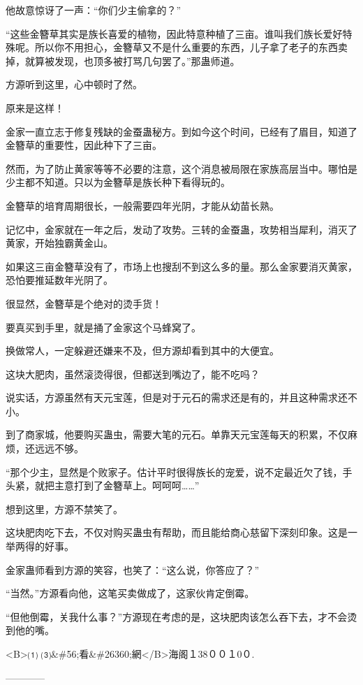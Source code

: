 \begin{this_body}
他故意惊讶了一声：“你们少主偷拿的？”

“这些金簪草其实是族长喜爱的植物，因此特意种植了三亩。谁叫我们族长爱好特殊呢。所以你不用担心，金簪草又不是什么重要的东西，儿子拿了老子的东西卖掉，就算被发现，也顶多被打骂几句罢了。”那蛊师道。

方源听到这里，心中顿时了然。

原来是这样！

金家一直立志于修复残缺的金蚕蛊秘方。到如今这个时间，已经有了眉目，知道了金簪草的重要性，因此种下了三亩。

然而，为了防止黄家等等不必要的注意，这个消息被局限在家族高层当中。哪怕是少主都不知道。只以为金簪草是族长种下看得玩的。

金簪草的培育周期很长，一般需要四年光阴，才能从幼苗长熟。

记忆中，金家就在一年之后，发动了攻势。三转的金蚕蛊，攻势相当犀利，消灭了黄家，开始独霸黄金山。

如果这三亩金簪草没有了，市场上也搜刮不到这么多的量。那么金家要消灭黄家，恐怕要推延数年光阴了。

很显然，金簪草是个绝对的烫手货！

要真买到手里，就是捅了金家这个马蜂窝了。

换做常人，一定躲避还嫌来不及，但方源却看到其中的大便宜。

这块大肥肉，虽然滚烫得很，但都送到嘴边了，能不吃吗？

说实话，方源虽然有天元宝莲，但是对于元石的需求还是有的，并且这种需求还不小。

到了商家城，他要购买蛊虫，需要大笔的元石。单靠天元宝莲每天的积累，不仅麻烦，还远远不够。

“那个少主，显然是个败家子。估计平时很得族长的宠爱，说不定最近欠了钱，手头紧，就把主意打到了金簪草上。呵呵呵……”

想到这里，方源不禁笑了。

这块肥肉吃下去，不仅对购买蛊虫有帮助，而且能给商心慈留下深刻印象。这是一举两得的好事。

金家蛊师看到方源的笑容，也笑了：“这么说，你答应了？”

“当然。”方源看向他，这笔买卖做成了，这家伙肯定倒霉。

“但他倒霉，关我什么事？”方源现在考虑的是，这块肥肉该怎么吞下去，才不会烫到他的嘴。

<B>⑴ ⑶\&\#56;看\&\#26360;網</B>海阁１38００１0０.

------------

\end{this_body}


